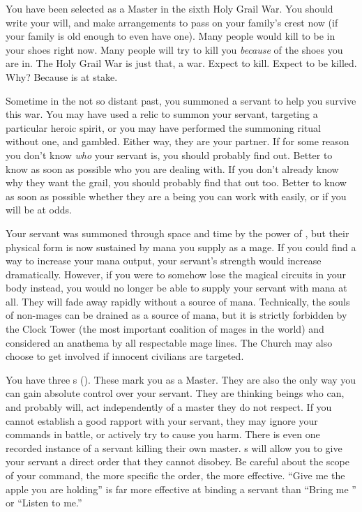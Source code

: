 \documentclass[blue]{FateDarkDawn}
\begin{document}
\name{\bMaster{}}

You have been selected as a Master in the sixth Holy Grail War. You should write your will, and make arrangements to pass on your family's crest now (if your family is old enough to even have one). Many people would kill to be in your shoes right now. Many people will try to kill you \emph{because} of the shoes you are in. The Holy Grail War is just that, a war. Expect to kill. Expect to be killed. Why? Because \iGrail{} is at stake.

Sometime in the not so distant past, you summoned a servant to help you survive this war. You may have used a relic to summon your servant, targeting a particular heroic spirit, or you may have performed the summoning ritual without one, and gambled. Either way, they are your partner. If for some reason you don't know \emph{who} your servant is, you should probably find out. Better to know as soon as possible who you are dealing with. If you don't already know why they want the grail, you should probably find that out too. Better to know as soon as possible whether they are a being you can work with easily, or if you will be at odds.

Your servant was summoned through space and time by the power of \iGrail{\MYname}, but their physical form is now sustained by mana you supply as a mage. If you could find a way to increase your mana output, your servant's strength would increase dramatically. However, if you were to somehow lose the magical circuits in your body instead, you would no longer be able to supply your servant with mana at all. They will fade away rapidly without a source of mana. Technically, the souls of non-mages can be drained as a source of mana, but it is strictly forbidden by the Clock Tower (the most important coalition of mages in the world) and considered an anathema by all respectable mage lines. The Church may also choose to get involved if innocent civilians are  targeted.

You have three \iCommand{\MYname}s (\iCommand{\MYnumber}). These mark you as a Master. They are also the only way you can gain absolute control over your servant. They are thinking beings who can, and probably will, act independently of a master they do not respect. If you cannot establish a good rapport with your servant, they may ignore your commands in battle, or actively try to cause you harm. There is even one recorded instance of a servant killing their own master. \iCommand{\MYname}s will allow you to give your servant a direct order that they cannot disobey. Be careful about the scope of your command, the more specific the order, the more effective. ``Give me the apple you are holding'' is far more effective at binding a servant than ``Bring me \iGrail{\MYname}'' or ``Listen to me.''
\end{document}
